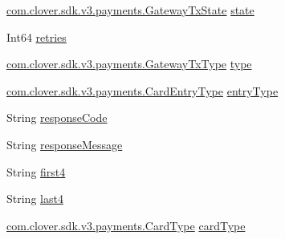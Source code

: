 \begin{DoxyCompactItemize}
\item 
\hyperlink{namespacecom_1_1clover_1_1sdk_1_1v3_1_1payments_a340cc82820b2cb686ec93885b8ebf612}{com.\+clover.\+sdk.\+v3.\+payments.\+Gateway\+Tx\+State} \hyperlink{classcom_1_1clover_1_1sdk_1_1v3_1_1payments_1_1_gateway_txs_a6c985515ca2b2b60e27e2c8f23349fa2}{state}
\item 
Int64 \hyperlink{classcom_1_1clover_1_1sdk_1_1v3_1_1payments_1_1_gateway_txs_acbfbb97ef73693059579773b8ddf30b2}{retries}
\item 
\hyperlink{namespacecom_1_1clover_1_1sdk_1_1v3_1_1payments_a3df1de2debbb23f9584db68737e035e7}{com.\+clover.\+sdk.\+v3.\+payments.\+Gateway\+Tx\+Type} \hyperlink{classcom_1_1clover_1_1sdk_1_1v3_1_1payments_1_1_gateway_txs_a5e9c7fbc2da3548484e2b1ea42890769}{type}
\item 
\hyperlink{namespacecom_1_1clover_1_1sdk_1_1v3_1_1payments_ac92e851a362529ec3fa138bd64dec615}{com.\+clover.\+sdk.\+v3.\+payments.\+Card\+Entry\+Type} \hyperlink{classcom_1_1clover_1_1sdk_1_1v3_1_1payments_1_1_gateway_txs_a9ff00bb1fa99f47023a4fe3b0d423d78}{entry\+Type}
\item 
String \hyperlink{classcom_1_1clover_1_1sdk_1_1v3_1_1payments_1_1_gateway_txs_a0b3e602064ea5c1996cc0fee63f560b3}{response\+Code}
\item 
String \hyperlink{classcom_1_1clover_1_1sdk_1_1v3_1_1payments_1_1_gateway_txs_ab64233f74d5acda4b9779ecbb95e38ab}{response\+Message}
\item 
String \hyperlink{classcom_1_1clover_1_1sdk_1_1v3_1_1payments_1_1_gateway_txs_a2850aa45e6ba82366f6f7ddcb37387d2}{first4}
\item 
String \hyperlink{classcom_1_1clover_1_1sdk_1_1v3_1_1payments_1_1_gateway_txs_a2115189935e1ed5762c1e26c555e387f}{last4}
\item 
\hyperlink{namespacecom_1_1clover_1_1sdk_1_1v3_1_1payments_ae544d2f27295fd15a3abb7d87bc35928}{com.\+clover.\+sdk.\+v3.\+payments.\+Card\+Type} \hyperlink{classcom_1_1clover_1_1sdk_1_1v3_1_1payments_1_1_gateway_txs_ae63abfb2fdd6f5ef89cb0ee58b2d0cf6}{card\+Type}

\end{DoxyCompactItemize}
